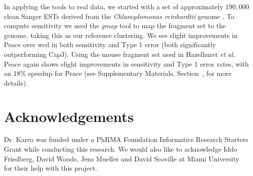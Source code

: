 \documentclass[a4,center,fleqn]{NAR}
\begin{document}
In applying the tools to real data, we started with a set of
approximately $190,000$ clean Sanger ESTs derived from the {\it
  Chlamydomonas reinhardtii} genome \cite{Liang2008}.  To compute
sensitivity we used the {\it gmap} tool \cite{Wu05} to map the
fragment set to the genome, taking this as our reference clustering.
We see slight improvements in {\sc Peace} over {\sc wcd} in both
sensitivity and Type 1 error (both significantly outperforming {\sc
  Cap3}).  Using the mouse fragment set used in Hazelhurst {\it et
  al.}  \cite{Hazelhurst08a} {\sc Peace} again shows slight
improvements in sensitivity and Type 1 error rates, with an 18\% speedup
for {\sc Peace} (see Supplementary Materials,
Section~\href{real_results}, for more details).

\section{Acknowledgements}

Dr. Karro was funded under a PhRMA Foundation Informatics Research
Starters Grant while conducting this research.  We would also like to
acknowledge Iddo Friedberg, David Woods, Jens Mueller and David
Scoville at Miami University for their help with this project.

\vspace{3mm}


\end{document}
